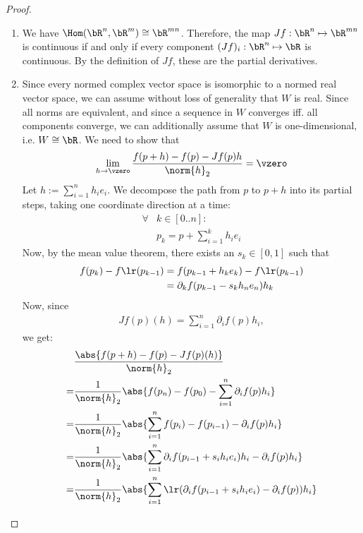 \begin{proof}
	\begin{enumerate}
		\item[$\Rightarrow$:] We have $\Hom(\bR^n, \bR^m) \cong \bR^{mn}$. Therefore, the map $Jf : \bR^n \mapsto \bR^{mn}$ is continuous if and only if every component $(Jf)_i : \bR^n \mapsto \bR$ is continuous. By the definition of $Jf$, these are the partial derivatives.
		\item[$\Leftarrow$:]
		Since every normed complex vector space is isomorphic to a normed real vector space, we can assume without loss of generality that $W$ is real. Since all norms are equivalent, and since a sequence in $W$ converges iff. all components converge, we can additionally assume that $W$ is one-dimensional, i.e. $W \cong \bR$.
		\newpar
		We need to show that
		\begin{align*}
			\lim_{h \to \vzero} \frac{f(p+h) - f(p) - Jf(p)h}{\norm{h}_2} = \vzero
		\end{align*}
		Let $h := \sum_{i = 1}^n h_ie_i$. We decompose the path from $p$ to $p+h$ into its partial steps, taking one coordinate direction at a time:
		\begin{align*}
			\forall &k \in [0..n]:\\
			&p_k = p + \sum_{i = 1}^k h_i e_i
		\end{align*}
		Now, by the mean value theorem, there exists an $s_k \in [0,1]$ such that
		\begin{align*}
			f(p_k) - f\lr(p_{k-1})
			&=
			f(p_{k-1} + h_ke_k) - f\lr(p_{k-1})\\
			&= \partial_k f(p_{k-1} - s_kh_ne_n)h_k
		\end{align*}
		Now, since 
		\begin{align*}
			Jf(p)(h) = \sum_{i = 1}^n \partial_i f(p)h_i,
		\end{align*}
		we get:
		\begin{align*}
			&\frac{\abs{f(p+h) - f(p) - Jf(p)(h)}}{\norm{h}_2}\\
			=
			&\frac{1}{\norm{h}_2}\abs{f(p_n) - f(p_0) - \sum_{i = 1}^n \partial_i f(p)h_i}\\
			=
			&\frac{1}{\norm{h}_2}
			\abs{\sum_{i = 1}^n f(p_i) - f(p_{i-1}) - \partial_i f(p) h_i}\\
			=
			&\frac{1}{\norm{h}_2}
			\abs{\sum_{i = 1}^n \partial_i f(p_{i-1} + s_ih_ie_i)h_i - \partial_i f(p) h_i}\\
			=
			&\frac{1}{\norm{h}_2}
			\abs{\sum_{i = 1}^n \lr(\partial_i f(p_{i-1} + s_ih_ie_i) - \partial_i f(p)) h_i}\\

\end{align*}
\end{enumerate}
\end{proof}
